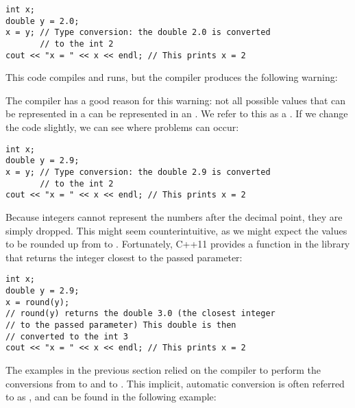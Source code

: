 \noindent\begin{minipage}{\linewidth}\begin{lstlisting}
int x;
double y = 2.0;
x = y; // Type conversion: the double 2.0 is converted 
       // to the int 2
cout << "x = " << x << endl; // This prints x = 2
\end{lstlisting}\end{minipage}

\noindent This code compiles and runs, but the compiler produces the following warning:

\noindent {}

The compiler has a good reason for this warning: not all possible values that can be represented in a  can be represented in an . 
We refer to this as a . 
If we change the code slightly, we can see where problems can occur:

\noindent\begin{minipage}{\linewidth}\begin{lstlisting}
int x;
double y = 2.9;
x = y; // Type conversion: the double 2.9 is converted 
       // to the int 2
cout << "x = " << x << endl; // This prints x = 2
\end{lstlisting}\end{minipage}

Because integers cannot represent the numbers after the decimal point, they are simply dropped. 
This might seem counterintuitive, as we might expect the values to be rounded up from  to . 
Fortunately, C++11 provides a  function in the  library that returns the integer closest to the passed parameter:

\noindent\begin{minipage}{\linewidth}\begin{lstlisting}
int x;
double y = 2.9;
x = round(y); 
// round(y) returns the double 3.0 (the closest integer 
// to the passed parameter) This double is then 
// converted to the int 3
cout << "x = " << x << endl; // This prints x = 2
\end{lstlisting}\end{minipage}


The examples in the previous section relied on the compiler to perform the conversions from  to  and  to . 
This implicit, automatic conversion is often referred to as , and can be found in the following example:

